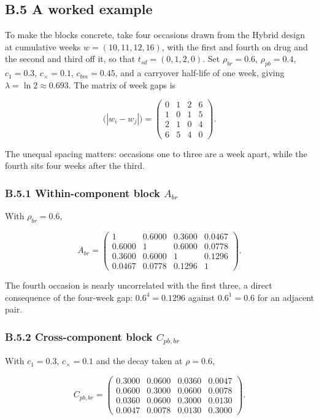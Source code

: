 \documentclass[
  11pt,
]{article}
\begin{document}
\subsection{B.5 A worked example}

To make the blocks concrete, take four occasions drawn from the
Hybrid design at cumulative weeks \(w = (10, 11, 12, 16)\), with the
first and fourth on drug and the second and third off it, so that
\(t_{sd} = (0, 1, 2, 0)\). Set \(\rho_{br} = 0.6\), \(\rho_{pb} = 0.4\),
\(c_1 = 0.3\), \(c_{\times} = 0.1\), \(c_{bm} = 0.45\), and a carryover
half-life of one week, giving \(\lambda = \ln 2 \approx 0.693\). The
matrix of week gaps is

\[
\bigl(|w_i - w_j|\bigr) =
\begin{pmatrix}
0 & 1 & 2 & 6\\
1 & 0 & 1 & 5\\
2 & 1 & 0 & 4\\
6 & 5 & 4 & 0
\end{pmatrix}.
\]

The unequal spacing matters: occasions one to three are a week apart,
while the fourth sits four weeks after the third.

\subsubsection{B.5.1 Within-component block $A_{br}$}

With \(\rho_{br} = 0.6\),

\[
A_{br} =
\begin{pmatrix}
1 & 0.6000 & 0.3600 & 0.0467\\
0.6000 & 1 & 0.6000 & 0.0778\\
0.3600 & 0.6000 & 1 & 0.1296\\
0.0467 & 0.0778 & 0.1296 & 1
\end{pmatrix}.
\]

The fourth occasion is nearly uncorrelated with the first three, a
direct consequence of the four-week gap: \(0.6^{4} = 0.1296\) against
\(0.6^{1} = 0.6\) for an adjacent pair.

\subsubsection{B.5.2 Cross-component block $C_{pb,br}$}

With \(c_1 = 0.3\), \(c_{\times} = 0.1\) and the decay taken at
\(\rho = 0.6\),

\[
C_{pb,br} =
\begin{pmatrix}
0.3000 & 0.0600 & 0.0360 & 0.0047\\
0.0600 & 0.3000 & 0.0600 & 0.0078\\
0.0360 & 0.0600 & 0.3000 & 0.0130\\
0.0047 & 0.0078 & 0.0130 & 0.3000
\end{pmatrix}.
\]
\end{document}
